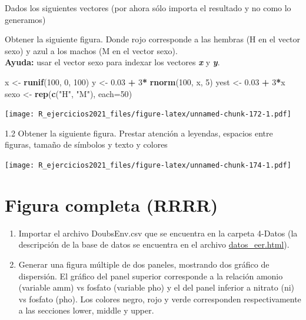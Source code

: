 \documentclass[]{book}
\newenvironment{Shaded}{\begin{snugshade}}{\end{snugshade}}
\newcommand{\DataTypeTok}[1]{\textcolor[rgb]{0.13,0.29,0.53}{#1}}
\newcommand{\DecValTok}[1]{\textcolor[rgb]{0.00,0.00,0.81}{#1}}
\newcommand{\FloatTok}[1]{\textcolor[rgb]{0.00,0.00,0.81}{#1}}
\newcommand{\KeywordTok}[1]{\textcolor[rgb]{0.13,0.29,0.53}{\textbf{#1}}}
\newcommand{\NormalTok}[1]{#1}
\newcommand{\OperatorTok}[1]{\textcolor[rgb]{0.81,0.36,0.00}{\textbf{#1}}}
\newcommand{\StringTok}[1]{\textcolor[rgb]{0.31,0.60,0.02}{#1}}
\begin{document}
Dados los siguientes vectores (por ahora sólo importa el resultado y no como lo generamos)

Obtener la siguiente figura. Donde rojo corresponde a las hembras (H en el vector sexo) y azul a los machos (M en el vector sexo).\\
\textbf{Ayuda:} usar el vector sexo para indexar los vectores \textbf{\emph{x}} y \textbf{\emph{y}}.

\begin{Shaded}
\begin{Highlighting}[]
\NormalTok{x <-}\StringTok{ }\KeywordTok{runif}\NormalTok{(}\DecValTok{100}\NormalTok{, }\DecValTok{0}\NormalTok{, }\DecValTok{100}\NormalTok{)}
\NormalTok{y <-}\StringTok{ }\FloatTok{0.03} \OperatorTok{+}\StringTok{ }\DecValTok{3}\OperatorTok{*}\StringTok{ }\KeywordTok{rnorm}\NormalTok{(}\DecValTok{100}\NormalTok{, x, }\DecValTok{5}\NormalTok{)}
\NormalTok{yest <-}\StringTok{ }\FloatTok{0.03} \OperatorTok{+}\StringTok{ }\DecValTok{3}\OperatorTok{*}\NormalTok{x}
\NormalTok{sexo <-}\StringTok{ }\KeywordTok{rep}\NormalTok{(}\KeywordTok{c}\NormalTok{(}\StringTok{"H"}\NormalTok{, }\StringTok{"M"}\NormalTok{), }\DataTypeTok{each=}\DecValTok{50}\NormalTok{)}
\end{Highlighting}
\end{Shaded}

\texttt{[image: R\_ejercicios2021\_files/figure-latex/unnamed-chunk-172-1.pdf]}

1.2 Obtener la siguiente figura. Prestar atención a leyendas, espacios entre figuras, tamaño de símbolos y texto y colores

\texttt{[image: R\_ejercicios2021\_files/figure-latex/unnamed-chunk-174-1.pdf]}

\hypertarget{figura-completa-rrrr}{%
\section{Figura completa (RRRR)}\label{figura-completa-rrrr}}

\begin{enumerate}
\def\labelenumi{\arabic{enumi}.}
\item
  Importar el archivo DoubsEnv.csv que se encuentra en la carpeta 4-Datos (la descripción de la base de datos se encuentra en el archivo \url{datos_eer.html}).
\item
  Generar una figura múltiple de dos paneles, mostrando dos gráfico de dispersión. El gráfico del panel superior corresponde a la relación amonio (variable amm) vs fosfato (variable pho) y el del panel inferior a nitrato (ni) vs fosfato (pho). Los colores negro, rojo y verde corresponden respectivamente a las secciones lower, middle y upper.
\end{enumerate}
\end{document}
